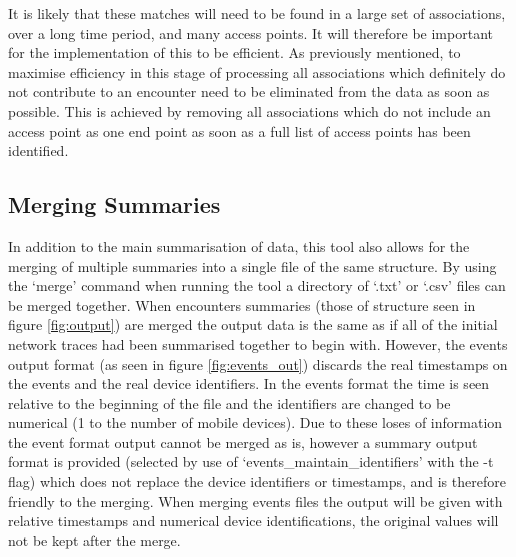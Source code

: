 It is likely that these matches will need to be found in a large set of associations, over a long time period, and many access points. It will therefore be important for the implementation of this to be efficient. As previously mentioned, to maximise efficiency in this stage of processing all associations which definitely do not contribute to an encounter need to be eliminated from the data as soon as possible. This is achieved by removing all associations which do not include an access point as one end point as soon as a full list of access points has been identified.
\subsection{Merging Summaries}
\label{section:merge}
In addition to the main summarisation of data, this tool also allows for the merging of multiple summaries into a single file of the same structure. By using the `merge' command when running the tool a directory of `.txt' or `.csv' files can be merged together. When encounters summaries (those of structure seen in figure \ref{fig:output}) are merged the output data is the same as if all of the initial network traces had been summarised together to begin with. However, the events output format (as seen in figure \ref{fig:events_out}) discards the real timestamps on the events and the real device identifiers. In the events format the time is seen relative to the beginning of the file and the identifiers are changed to be numerical (1 to the number of mobile devices). Due to these loses of information the event format output cannot be merged as is, however a summary output format is provided (selected by use of `events\_maintain\_identifiers' with the -t flag) which does not replace the device identifiers or timestamps, and is therefore friendly to the merging. When merging events files the output will be given with relative timestamps and numerical device identifications, the original values will not be kept after the merge.

